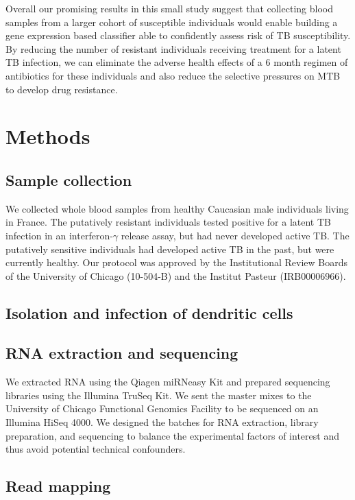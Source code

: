 \documentclass[fleqn,10pt]{wlscirep}
\begin{document}
Overall our promising results in this small study suggest that
collecting blood samples from a larger cohort of susceptible
individuals would enable building a gene expression based classifier
able to confidently assess risk of TB susceptibility. By reducing the
number of resistant individuals receiving treatment for a latent TB
infection, we can eliminate the adverse health effects of a 6 month
regimen of antibiotics for these individuals and also reduce the
selective pressures on MTB to develop drug resistance.
\section*{Methods}

\subsection*{Sample collection}

We collected whole blood samples from healthy Caucasian male
individuals living in France. The putatively resistant individuals
tested positive for a latent TB infection in an interferon-$\gamma$
release assay, but had never developed active TB. The putatively
sensitive individuals had developed active TB in the past, but were
currently healthy. Our protocol was approved by the Institutional
Review Boards of the University of Chicago (10-504-B) and the Institut
Pasteur (IRB00006966).
\subsection*{Isolation and infection of dendritic cells}


\subsection*{RNA extraction and sequencing}

We extracted RNA using the Qiagen miRNeasy Kit and prepared sequencing
libraries using the Illumina TruSeq Kit. We sent the master mixes to
the University of Chicago Functional Genomics Facility to be sequenced
on an Illumina HiSeq 4000. We designed the batches for RNA extraction,
library preparation, and sequencing to balance the experimental
factors of interest and thus avoid potential technical confounders.
\subsection*{Read mapping}
\end{document}
